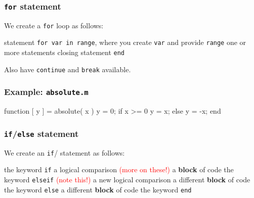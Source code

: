 \documentclass[11pt]{beamer}
\begin{document}
\begin{frame}[fragile]
  \frametitle{\texttt{for} statement}
  \Enlarge

  \begin{itemize}
  \myitem  We create a \texttt{for} loop as follows:
    \begin{itemize}
    \mysubitem  statement \texttt{for var in range}, where you create \texttt{var} and provide \texttt{range}
    \mysubitem  one or more statements
    \mysubitem  closing statement \texttt{end}
    \end{itemize}
  \pause
  \myitem  Also have \texttt{continue} and \texttt{break} available.
  \end{itemize}
\end{frame}

\begin{frame}[fragile]
  \frametitle{Example:  \texttt{absolute.m}}
  \Enlarge

  \begin{semiverbatim}
function [ y ] = absolute( x )
    y = 0;
    if x >= 0
        y = x;
    else
        y = -x;
end
  \end{semiverbatim}
\end{frame}

\begin{frame}[fragile]
  \frametitle{\texttt{if}/\texttt{else} statement}
  \Enlarge

  \begin{itemize}
  \myitem  We create an \texttt{if}/ statement as follows:
    \begin{itemize}
    \mysubitem  the keyword \texttt{if}
    \mysubitem  a logical comparison \textcolor{red}{(more on these!)}
    \mysubitem  a \textbf{block} of code  \pause
    \mysubitem  the keyword \texttt{elseif} \textcolor{red}{(note this!)}
    \mysubitem  a new logical comparison
    \mysubitem  a different \textbf{block} of code  \pause
    \mysubitem  the keyword \texttt{else}
    \mysubitem  a different \textbf{block} of code  \pause
    \mysubitem  the keyword \texttt{end}
    \end{itemize}
  \end{itemize}
\end{frame}
\end{document}
